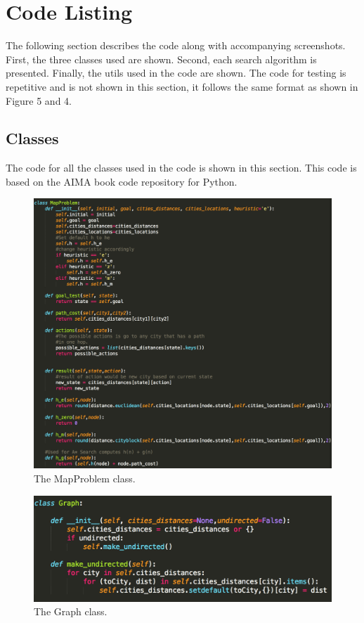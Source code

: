 \documentclass[12pt, letter]{article}
\begin{document}
\section{Code Listing}

The following section describes the code along with accompanying screenshots. First, the three classes used are shown. Second, each search algorithm is presented. Finally, the utils used in the code are shown. The code for testing is repetitive and is not shown in this section, it follows the same format as shown in Figure 5 and  4.

\subsection{Classes}

The code for all the classes used in the code is shown in this section. This code is based on the AIMA book code repository for Python.

 \begin{figure}[htb]
  \centering
  \includegraphics[width=0.9 \textwidth]{./graphs/class_map.png}
  \caption{The MapProblem class.}
\end{figure}

\begin{figure}[htb]
  \centering
  \includegraphics[width=0.9 \textwidth]{./graphs/class_graph.png}
  \caption{The Graph class.}
\end{figure}
\end{document}
